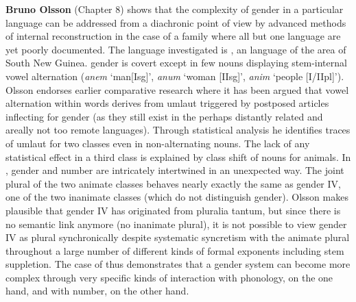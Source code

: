 \documentclass[output=collectionpaper]{langsci/langscibook}
\begin{document}
\textbf{Bruno Olsson} (Chapter 8) shows that the complexity of gender in a particular language can be addressed from a diachronic point of view by advanced methods of internal reconstruction in the case of a family where all but one language are yet poorly documented. The language investigated is , an  language of the  area of South New Guinea.  gender is covert except in few nouns displaying stem-internal vowel alternation (\textit{anem} ‘man[Isg]’, \textit{anum} ‘woman [IIsg]’, \textit{anim} ‘people [I/IIpl]’). Olsson endorses earlier comparative research where it has been argued that vowel alternation within  words derives from umlaut triggered by postposed articles inflecting for gender (as they still exist in the perhaps distantly related and areally not too remote  languages). Through statistical analysis he identifies traces of umlaut for two classes even in non-alternating nouns. The lack of any statistical effect in a third class is explained by class shift of nouns for animals. In , gender and number are intricately intertwined in an unexpected way. The joint plural of the two animate classes behaves nearly exactly the same as gender IV, one of the two inanimate classes (which do not distinguish gender). Olsson makes plausible that gender IV has originated from pluralia tantum, but since there is no semantic link anymore (no inanimate plural), it is not possible to view gender IV as plural synchronically despite systematic syncretism with the animate plural throughout a large number of different kinds of formal exponents including stem suppletion. The case of  thus demonstrates that a gender system can become more complex through very specific kinds of interaction with phonology, on the one hand, and with number, on the other hand.
\end{document}
